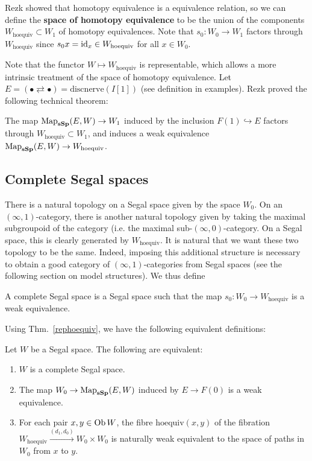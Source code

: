 \begin{refsection}
Rezk \cite[Lemma 5.8]{rezk-a-model-for-the-homotopy-theory-of-homotopy-theories} showed that homotopy equivalence is a equivalence relation, so we can define the \textbf{space of homotopy equivalence} to be the union of the components $W_{\mathrm{hoequiv}}\subset W_1$ of homotopy equivalences. Note that $s_0:W_0\to W_1$ factors through $W_{\mathrm{hoequiv}}$ since $s_0x=\mathrm{id}_x\in W_{\mathrm{hoequiv}}$ for all $x\in W_0$.

Note that the functor $W\mapsto W_{\mathrm{hoequiv}}$ is representable, which allows a more intrinsic treatment of the space of homotopy equivalence. Let $E=(\bullet\rightleftarrows\bullet)=\mathrm{discnerve}(I[1])$ (see definition in examples). Rezk proved the following technical theorem:
\begin{thm}\label{rephoequiv}
The map $\operatorname{\mathrm{Map}}_{\mathbf{sSp}}(E,W)\to W_1$ induced by the inclusion $F(1)\hookrightarrow E$ factors through $W_{\mathrm{hoequiv}}\subset W_1$, and induces a weak equivalence $\operatorname{\mathrm{Map}}_{\mathbf{sSp}}(E,W)\to W_{\mathrm{hoequiv}}$.
\end{thm}

\subsection{Complete Segal spaces}
There is a natural topology on a Segal space given by the space $W_0$. On an $(\infty,1)$-category, there is another natural topology given by taking the maximal subgroupoid of the category (i.e. the maximal sub-$(\infty,0)$-category. On a Segal space, this is clearly generated by $W_{\mathrm{hoequiv}}$. It is natural that we want these two topology to be the same. Indeed, imposing this additional structure is necessary to obtain a good category of $(\infty,1)$-categories from Segal spaces (see the following section on model structures). We thus define
\begin{defin}
A complete Segal space is a Segal space such that the map $s_0:W_0\to W_{\mathrm{hoequiv}}$ is a weak equivalence.
\end{defin}

Using Thm.~\ref{rephoequiv}, we have the following equivalent definitions:
\begin{cor}\label{rephoequivcor}
Let $W$ be a Segal space. The following are equivalent:
\begin{enumerate}
\item $W$ is a complete Segal space.
\item The map $W_0\to\operatorname{\mathrm{Map}}_{\mathbf{sSp}}(E,W)$ induced by $E\to F(0)$ is a weak equivalence.
\item For each pair $x,y\in\operatorname{Ob} W$, the fibre $\mathrm{hoequiv}(x,y)$ of the fibration $W_{\mathrm{hoequiv}}\xrightarrow{(d_1,d_0)} W_0\times W_0$ is naturally weak equivalent to the space of paths in $W_0$ from $x$ to $y$.
\end{enumerate}
\end{cor}


\end{refsection}
